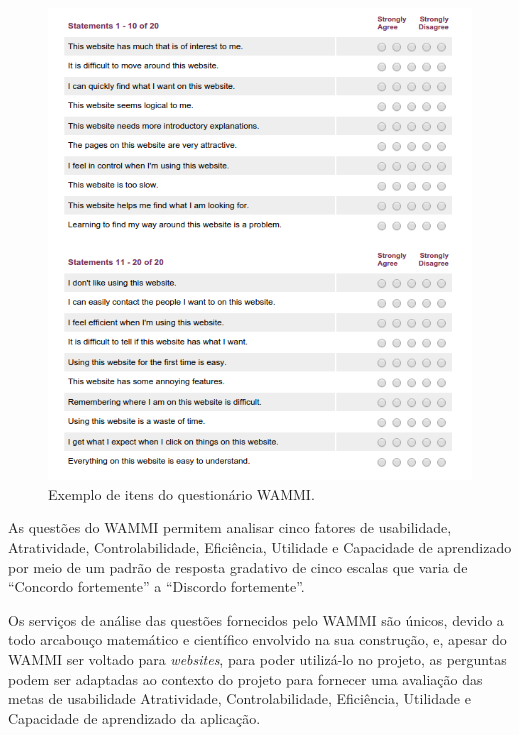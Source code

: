      \begin{figure}[!htpb]
	\centering
	\includegraphics[scale=0.67]{editaveis/figuras/wammi_questions}
	\caption[Exemplo de itens do questionário WAMMI]{Exemplo de itens do questionário WAMMI. \footnotemark}
	\label{wammi_questions}
      \end{figure}
      
      As questões do WAMMI permitem analisar cinco fatores de usabilidade, Atratividade, Controlabilidade, Eficiência, Utilidade
      e Capacidade de aprendizado por meio de um padrão de resposta gradativo de cinco escalas que varia de “Concordo fortemente”
      a “Discordo fortemente”.
      
      Os serviços de análise das questões fornecidos pelo WAMMI são únicos, devido a todo arcabouço matemático e científico
      envolvido na sua construção, e, apesar do WAMMI ser voltado para \textit{websites}, para poder utilizá-lo no projeto, as perguntas
      podem ser adaptadas ao contexto do projeto para fornecer uma avaliação das metas de usabilidade Atratividade,
      Controlabilidade, Eficiência, Utilidade e Capacidade de aprendizado da aplicação.
    

